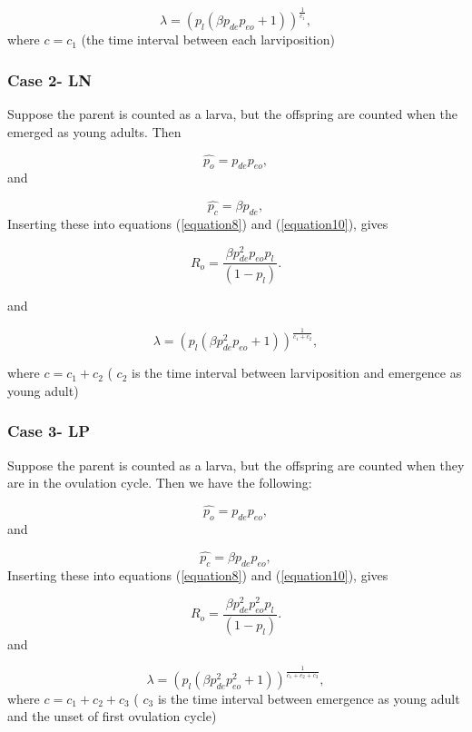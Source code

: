 \documentclass[10pt,a4paper]{article}
\begin{document}
\begin{equation}
\label{equation101} 
\lambda =(p_l(\beta p_{de}p_{eo}+1))^\frac{1}{c_1},
\end{equation}
where $c = c_1$ (the time interval between each larviposition) 
 
\subsubsection*{Case 2- LN}

Suppose the parent is counted as a larva, but the offspring are counted when the emerged as young adults. Then 

$$\hat{p_o}= p_{de}p_{eo},$$ and 

$$\hat{p_c}= \beta p_{de},$$
Inserting these into  equations (\ref{equation8}) and (\ref{equation10}), gives

\begin{equation}
\label{equation882} 
R_o =\frac{\beta p^2_{de}p_{eo}p_l}{(1-p_l)}.
\end{equation} 

and

\begin{equation}
\label{equation102} 
\lambda =(p_l(\beta p^2_{de}p_{eo}+1))^\frac{1}{c_1 + c_2},
\end{equation}

where $c = c_1 + c_2$ ( $c_2$ is the time interval between larviposition and emergence as young adult)   


\subsubsection*{Case 3- LP}

Suppose the parent is counted as a larva, but the offspring are counted when they are in the ovulation cycle. Then we have the following:

$$\hat{p_o}= p_{de}p_{eo},$$ and 

$$\hat{p_c}= \beta p_{de}p_{eo},$$
Inserting these into  equations (\ref{equation8}) and (\ref{equation10}), gives

\begin{equation}
\label{equation883} 
R_o =\frac{\beta p^2_{de}p^2_{eo}p_l}{(1-p_l)}.
\end{equation} and

\begin{equation}
\label{equation103} 
\lambda =(p_l(\beta p^2_{de}p^2_{eo}+1))^\frac{1}{c_1 + c_2 + c_3},
\end{equation} 
where $c = c_1 + c_2 + c_3$ ( $c_3$ is the time interval between emergence as young adult and the unset of first ovulation cycle) 
\end{document}
